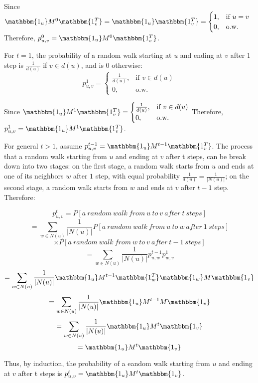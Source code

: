 \documentclass[11pt]{article} %
\begin{document}
Since $\mathbbm{1_u} M^0 \mathbbm{1_v^T}=\mathbbm{1_u} \mathbbm{1_v^T}= \begin{cases} 
1, &\mbox{if } u=v \\
 0, & \mbox{o.w.} \end{cases}$ 
Therefore, $p_{u,v}^0=\mathbbm{1_u} M^0 \mathbbm{1_v^T} $.

For $t=1$, the probability of a random walk starting at $u$ and ending at $v$ after 1 step is $\frac{1}{d(u)}$ if $v \in d(u)$, and is 0 otherwise: 
$$ p_{u,v}^1= \begin{cases} 
\frac{1}{d(u)}, &\mbox{if } v \in d(u) \\
 0, & \mbox{o.w.} \end{cases}$$

Since $\mathbbm{1_u} M^1 \mathbbm{1_v^T}= \begin{cases} 
\frac{1}{d(u)}, &\mbox{if } v \in d(u) \\
 0, & \mbox{o.w.} \end{cases}$ 
Therefore, $p_{u,v}^1=\mathbbm{1_u} M^1 \mathbbm{1_v^T} $.

For general $t>1$, assume  $p_{u,v}^{t-1}=\mathbbm{1_u} M^{t-1} \mathbbm{1_v^T} $. The process that a random walk starting from $u$ and ending at $v$ after t steps, can be break down into two stages: on the first stage, a random walk starts from $u$ and ends at one of its neighbors $w$ after $1$ step, with equal probability $\frac{1}{d(u)}=\frac{1}{|N(u)|}$; on the second stage, a random walk starts from $w$ and ends at $v$ after $t-1$ step. Therefore:

$$ p_{u,v}^t=P[a \ random \ walk \ from \ u \ to \ v \ after \ t \ steps]$$
$$=\sum_{w \in N(u)} \frac{1}{|N(u)|} P[a \ random \ walk \ from \ u \ to \ w \ after \ 1 \ steps]$$
$$\times P[a \ random \ walk \ from \ w \ to \ v \ after \ t-1 \ steps]$$
$$=\sum_{w \in N(u)}\frac{1}{|N(u)|} p_{u,w}^{t-1} p_{w,v}^1$$
$$=\sum_{w \in N(u)} \frac{1}{|N(u)|} \mathbbm{1_u} M^{t-1}  \mathbbm{1_w^T} \mathbbm{1_w} M \mathbbm{1_v}$$
$$=\sum_{w \in N(u)} \frac{1}{|N(u)|} \mathbbm{1_u} M^{t-1} M \mathbbm{1_v}$$
$$=\sum_{w \in N(u)} \frac{1}{|N(u)|} \mathbbm{1_u} M^{t} \mathbbm{1_v}$$
$$= \mathbbm{1_u} M^{t} \mathbbm{1_v}$$

Thus, by induction, the probability of a eandom walk starting from $u$ and ending at $v$ after t steps is $p_{u,v}^t= \mathbbm{1_u} M^{t} \mathbbm{1_v}$.
\end{document}
